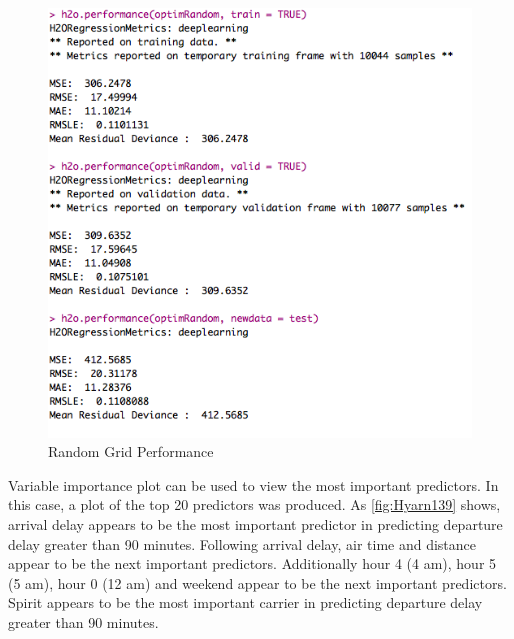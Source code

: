 \documentclass[12pt,twoside]{amherstthesis}
\begin{document}
  \begin{figure}[htbp]
  \centering
  \includegraphics[scale = 0.8,angle = 0]{figure/DeepGridPerformRand.png}
  \caption[Random Grid Performance]{\normalsize{Random Grid Performance}}
  \label{fig:Hyarn124}
  \end{figure}
  
  Variable importance plot can be used to view the most important
  predictors. In this case, a plot of the top 20 predictors was produced.
  As \autoref{fig:Hyarn139} shows, arrival delay appears to be the most
  important predictor in predicting departure delay greater than 90
  minutes. Following arrival delay, air time and distance appear to be the
  next important predictors. Additionally hour 4 (4 am), hour 5 (5 am),
  hour 0 (12 am) and weekend appear to be the next important predictors.
  Spirit appears to be the most important carrier in predicting departure
  delay greater than 90 minutes.
  
  \begin{Shaded}
  \begin{Highlighting}[]
   \NormalTok{)}
  \end{Highlighting}
  \end{Shaded}
  
\end{document}
